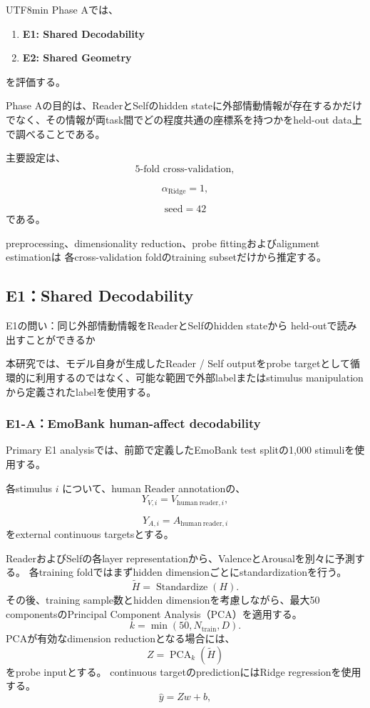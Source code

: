 \documentclass{article} %
\begin{document}
\begin{CJK*}{UTF8}{min}
Phase Aでは、
\begin{enumerate}
    \item \textbf{E1: Shared Decodability}
    \item \textbf{E2: Shared Geometry}
\end{enumerate}
を評価する。

Phase Aの目的は、ReaderとSelfのhidden stateに外部情動情報が存在するかだけでなく、その情報が両task間でどの程度共通の座標系を持つかをheld-out data上で調べることである。

主要設定は、
\[
\text{5-fold cross-validation},
\]

\[
\alpha_{\mathrm{Ridge}}=1,
\]

\[
\text{seed}=42
\]
である。

preprocessing、dimensionality reduction、probe fittingおよびalignment estimationは
各cross-validation foldのtraining subsetだけから推定する。


\subsection{E1：Shared Decodability}
\label{app:v1-e1}

E1の問い：同じ外部情動情報をReaderとSelfのhidden stateから
held-outで読み出すことができるか

本研究では、モデル自身が生成したReader / Self outputをprobe targetとして循環的に利用するのではなく、可能な範囲で外部labelまたはstimulus manipulationから定義されたlabelを使用する。


\subsubsection{E1-A：EmoBank human-affect decodability}

Primary E1 analysisでは、前節で定義したEmoBank test splitの1,000 stimuliを使用する。

各stimulus \(i\) について、human Reader annotationの、
\[
Y_{V,i}
=
V_{\mathrm{human\ reader},i},
\]

\[
Y_{A,i}
=
A_{\mathrm{human\ reader},i}
\]
をexternal continuous targetsとする。

ReaderおよびSelfの各layer representationから、ValenceとArousalを別々に予測する。
各training foldではまずhidden dimensionごとにstandardizationを行う。
\[
\widetilde{H}
=
\operatorname{Standardize}(H).
\]
その後、training sample数とhidden dimensionを考慮しながら、最大50 componentsのPrincipal Component Analysis（PCA）を適用する。
\[
k
=
\min
(
50,
N_{\mathrm{train}},
D
).
\]
PCAが有効なdimension reductionとなる場合には、
\[
Z
=
\operatorname{PCA}_k(\widetilde H)
\]
をprobe inputとする。
continuous targetのpredictionにはRidge regressionを使用する。
\[
\hat y
=
Zw+b,
\]


\end{CJK*}
\end{document}
